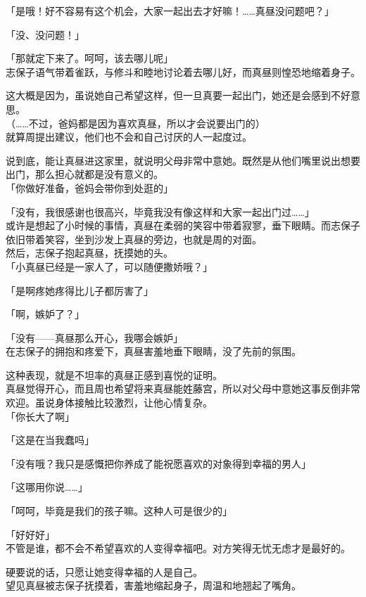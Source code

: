 「是哦！好不容易有这个机会，大家一起出去才好嘛！……真昼没问题吧？」

「没、没问题！」

「那就定下来了。呵呵，该去哪儿呢」\\

志保子语气带着雀跃，与修斗和睦地讨论着去哪儿好，而真昼则惶恐地缩着身子。

这大概是因为，虽说她自己希望这样，但一旦真要一起出门，她还是会感到不好意思。\\

（……不过，爸妈都是因为喜欢真昼，所以才会说要出门的）\\

就算周提出建议，他们也不会和自己讨厌的人一起度过。

说到底，能让真昼进这家里，就说明父母非常中意她。既然是从他们嘴里说出想要出门，那么担心就都是没有意义的。\\

「你做好准备，爸妈会带你到处逛的」

「没有，我很感谢也很高兴，毕竟我没有像这样和大家一起出门过……」\\

或许是想起了小时候的事情，真昼在柔弱的笑容中带着寂寥，垂下眼睛。而志保子依旧带着笑容，坐到沙发上真昼的旁边，也就是周的对面。\\

然后，志保子抱起真昼，抚摸她的头。\\

「小真昼已经是一家人了，可以随便撒娇哦？」

「是啊疼她疼得比儿子都厉害了」

「啊，嫉妒了？」

「没有——真昼那么开心，我哪会嫉妒」\\

在志保子的拥抱和疼爱下，真昼害羞地垂下眼睛，没了先前的氛围。

这种表现，就是不坦率的真昼正感到喜悦的证明。\\

真昼觉得开心，而且周也希望将来真昼能姓藤宫，所以对父母中意她这事反倒非常欢迎。虽说身体接触比较激烈，让他心情复杂。\\

「你长大了啊」

「这是在当我蠢吗」

「没有哦？我只是感慨把你养成了能祝愿喜欢的对象得到幸福的男人」

「这哪用你说……」

「呵呵，毕竟是我们的孩子嘛。这种人可是很少的」

「好好好」\\

不管是谁，都不会不希望喜欢的人变得幸福吧。对方笑得无忧无虑才是最好的。

硬要说的话，只愿让她变得幸福的人是自己。\\

望见真昼被志保子抚摸着，害羞地缩起身子，周温和地翘起了嘴角。
